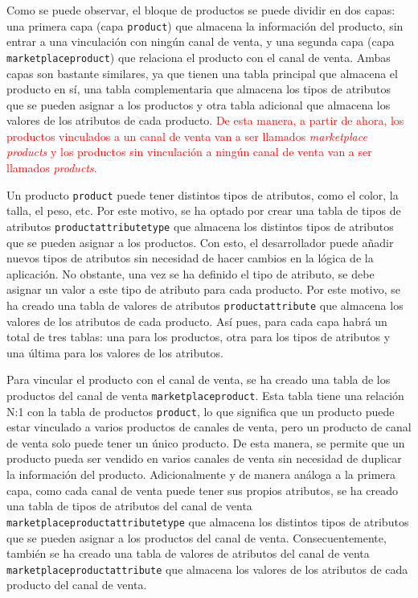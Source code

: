 Como se puede observar, el bloque de productos se puede dividir en dos capas: una primera capa (capa  \texttt{product}) que almacena la información del producto, sin entrar a una vinculación con ningún canal de venta, y una segunda capa (capa  \texttt{marketplaceproduct}) que relaciona el producto con el canal de venta. Ambas capas son bastante similares, ya que tienen una tabla principal que almacena el producto en sí, una tabla complementaria que almacena los tipos de atributos que se pueden asignar a los productos y otra tabla adicional que almacena los valores de los atributos de cada producto. \textcolor{red}{De esta manera, a partir de ahora, los productos vinculados a un canal de venta van a ser llamados \textit{marketplace products} y los productos sin vinculación a ningún canal de venta van a ser llamados \textit{products}.}

Un producto \texttt{product} puede tener distintos tipos de atributos, como el color, la talla, el peso, etc. Por este motivo, se ha optado por crear una tabla de tipos de atributos \texttt{productattributetype} que almacena los distintos tipos de atributos que se pueden asignar a los productos. Con esto, el desarrollador puede añadir nuevos tipos de atributos sin necesidad de hacer cambios en la lógica de la aplicación. No obstante, una vez se ha definido el tipo de atributo, se debe asignar un valor a este tipo de atributo para cada producto. Por este motivo, se ha creado una tabla de valores de atributos \texttt{productattribute} que almacena los valores de los atributos de cada producto. Así pues, para cada capa habrá un total de tres tablas: una para los productos, otra para los tipos de atributos y una última para los valores de los atributos.

Para vincular el producto con el canal de venta, se ha creado una tabla de los productos del canal de venta \texttt{marketplaceproduct}. Esta tabla tiene una relación N:1 con la tabla de productos \texttt{product}, lo que significa que un producto puede estar vinculado a varios productos de canales de venta, pero un producto de canal de venta solo puede tener un único producto. De esta manera, se permite que un producto pueda ser vendido en varios canales de venta sin necesidad de duplicar la información del producto. Adicionalmente y de manera análoga a la primera capa, como cada canal de venta puede tener sus propios atributos, se ha creado una tabla de tipos de atributos del canal de venta \texttt{marketplaceproductattributetype} que almacena los distintos tipos de atributos que se pueden asignar a los productos del canal de venta. Consecuentemente, también se ha creado una tabla de valores de atributos del canal de venta \texttt{marketplaceproductattribute} que almacena los valores de los atributos de cada producto del canal de venta.


